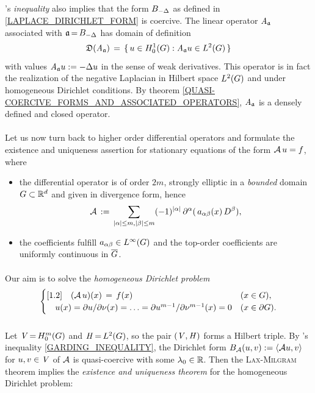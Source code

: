 \documentclass[11pt,twoside]{article}
\begin{document}
\subparagraph*{}
\textsc{{\POINCARE}}'s \textit{inequality} also implies that
the form $B_{-\Delta}$ as defined in \eqref{LAPLACE_DIRICHLET_FORM}
is coercive.
The linear operator $\mathit{A}_{\mathfrak{a}}$ associated with $\mathfrak{a} {\,=\,} B_{-\Delta}$
has domain of definition
\[
\mathfrak{D}(\mathit{A}_{\mathfrak{a}}) \,=\, \{\,u \in H_0^{1}(G): \mathit{A}_{\mathfrak{a}} u \in L^2(G)\,\}
\]
with values $\mathit{A}_{\mathfrak{a}} u := -\Delta u$ in the sense of weak derivatives.
This operator is in fact the realization of the negative Laplacian
in Hilbert space $L^2(G)$ and
under homogeneous Dirichlet conditions.
By theorem \ref{QUASI-COERCIVE_FORMS_AND_ASSOCIATED_OPERATORS},
$\mathit{A}_{\mathfrak{a}}$ is a densely defined and closed operator.

\paragraph*{} %
Let us now turn back to higher order differential operators and
formulate the existence and uniqueness assertion
for stationary equations of the form ${\mathcal{A}}\,u=f$,
where

\begin{itemize}[leftmargin=15mm]
\item[(DP-1)]
the differential operator is of order $2m$,
strongly elliptic in a \textit{bounded} domain $G \subset {\mathbb{R}}^d$
and given in divergence form,
hence
\[
\A \eqdef
\sum_{\abs{\alpha} \leq m, \abs{\beta} \leq m} (-1)^{\abs{\alpha} } \,
\PA(\,a_{\alpha \beta}(x) \, D^{\beta}),
\]

\item[(DP-2)]
the coefficients fulfill $a_{\alpha \beta} \in L^{\infty}(G)$ and
the top-order coefficients are uniformly continuous in $\overline{G}$.
\end{itemize}

\paragraph*{} %
Our aim is to solve the \textit{homogeneous Dirichlet problem}
\[
\begin{cases}[1.2]
\quad ({\mathcal{A}}\,u)(x)\,=\, f(x)& (x \in G),\\
\quad u(x) =
\partial u/ \partial \nu (x) =
\ldots = \partial u^{m-1} / \partial \nu^{m-1}(x) = 0 & (x \in \partial G).\\
\end{cases}
\]

\subparagraph*{}
Let $\mathit{V} {\,=\,} H_0^{m}(G)$ and $\mathit{H} {\,=\,} L^2(G)$,
so the pair $(\mathit{V},\mathit{H})$ forms a Hilbert triple.
By \textsc{{\GARDING}}'s inequality \eqref{GARDING_INEQUALITY},
the Dirichlet form $B_{{\mathcal{A}}}(u,v) := \langle {\mathcal{A}} u,v \rangle$ for $u,v \in \mathit{V}$
of ${\mathcal{A}}$ is quasi-coercive with some $\lambda_0 \in {\mathbb{R}}$.
Then the \textsc{Lax-Milgram} theorem implies
the \textit{existence and uniqueness theorem}
for the homogeneous Dirichlet problem:
\end{document}

